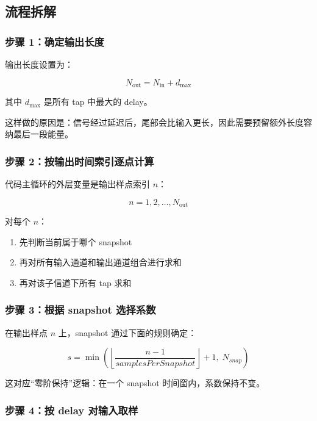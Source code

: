 \documentclass[12pt,a4paper]{article}
\begin{document}
\subsection{流程拆解}

\subsubsection{步骤 1：确定输出长度}

输出长度设置为：

\begin{equation}
N_{\text{out}} = N_{\text{in}} + d_{\max}
\end{equation}

其中 $d_{\max}$ 是所有 tap 中最大的 delay。

这样做的原因是：信号经过延迟后，尾部会比输入更长，因此需要预留额外长度容纳最后一段能量。

\subsubsection{步骤 2：按输出时间索引逐点计算}

代码主循环的外层变量是输出样点索引 $n$：

\begin{equation}
n = 1,2,\dots,N_{\text{out}}
\end{equation}

对每个 $n$：

\begin{enumerate}
\item 先判断当前属于哪个 snapshot
\item 再对所有输入通道和输出通道组合进行求和
\item 再对该子信道下所有 tap 求和
\end{enumerate}

\subsubsection{步骤 3：根据 snapshot 选择系数}

在输出样点 $n$ 上，snapshot 通过下面的规则确定：

\begin{equation}
s = \min\left(\left\lfloor \frac{n-1}{samplesPerSnapshot}\right\rfloor + 1,\; N_{snap}\right)
\end{equation}

这对应“零阶保持”逻辑：在一个 snapshot 时间窗内，系数保持不变。

\subsubsection{步骤 4：按 delay 对输入取样}
\end{document}

